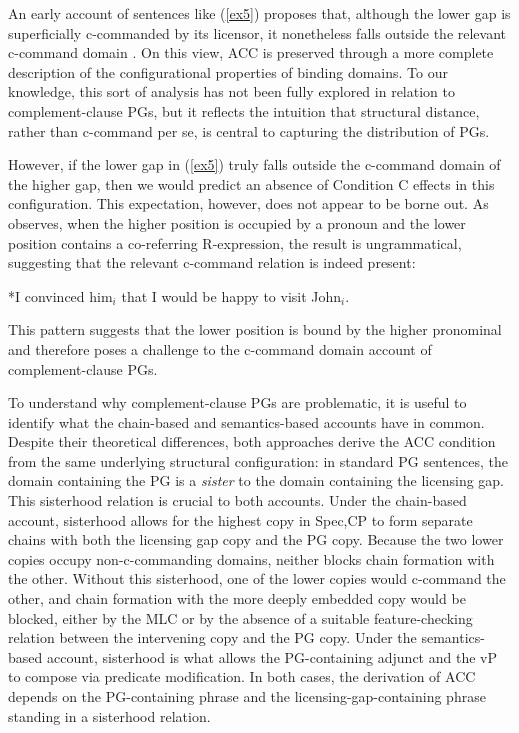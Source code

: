 \documentclass[12pt]{article}
\begin{document}
An early account of sentences like (\ref{ex5}) proposes that, although the lower gap is superficially c-commanded by its licensor, it nonetheless falls outside the relevant c-command domain \citep{chomsky1986}. On this view, ACC is preserved through a more complete description of the configurational properties of binding domains. To our knowledge, this sort of analysis has not been fully explored in relation to complement-clause PGs, but it reflects the intuition that structural distance, rather than c-command per se, is central to capturing the distribution of PGs. 

However, if the lower gap in (\ref{ex5}) truly falls outside the c-command domain of the higher gap, then we would predict an absence of Condition C effects in this configuration. This expectation, however, does not appear to be borne out. As \cite{stowell1985} observes, when the higher position is occupied by a pronoun and the lower position contains a co-referring R-expression, the result is ungrammatical, suggesting that the relevant c-command relation is indeed present:

\ex \label{ex7}
*I convinced him$_i$ that I would be happy to visit John$_i$. 
\xe

This pattern suggests that the lower position is bound by the higher pronominal and therefore poses a challenge to the c-command domain account of complement-clause PGs. 

To understand why complement-clause PGs are problematic, it is useful to identify what the chain-based and semantics-based accounts have in common. Despite their theoretical differences, both approaches derive the ACC condition from the same underlying structural configuration: in standard PG sentences, the domain containing the PG is a \textit{sister} to the domain containing the licensing gap. This sisterhood relation is crucial to both accounts. Under the chain-based account, sisterhood allows for the highest copy in Spec,CP to form separate chains with both the licensing gap copy and the PG copy. Because the two lower copies occupy non-c-commanding domains, neither blocks chain formation with the other. Without this sisterhood, one of the lower copies would c-command the other, and chain formation with the more deeply embedded copy would be blocked, either by the MLC or by the absence of a suitable feature-checking relation between the intervening copy and the PG copy. Under the semantics-based account, sisterhood is what allows the PG-containing adjunct and the vP to compose via predicate modification. In both cases, the derivation of ACC depends on the PG-containing phrase and the licensing-gap-containing phrase standing in a sisterhood relation.
\end{document}
